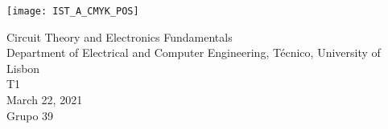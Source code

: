 
\thispagestyle {empty}

\texttt{[image: IST\_A\_CMYK\_POS]}

\begin{center}
    \vspace{1.0cm}

    \vspace{1cm}
    {\FontLb Circuit Theory and Electronics Fundamentals} \\ %
    \vspace{1cm}
    {\FontSn Department of Electrical and Computer Engineering, Técnico, University of Lisbon} \\ %
    \vspace{1cm}
    {\FontSn T1} \\
    \vspace{1cm}
    {\FontSn March 22, 2021} \\
    {\FontSn Grupo 39}
\end{center}

